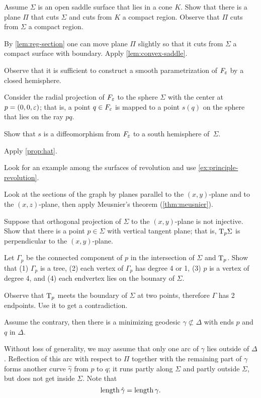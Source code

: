 Assume $\Sigma$ is an open saddle surface that lies in a cone $K$.
Show that there is a plane $\Pi$ that cuts $\Sigma$ and cuts from $K$ a compact region.
Observe that $\Pi$ cuts from $\Sigma$ a compact region.

By \ref{lem:reg-section} one can move plane $\Pi$ slightly so that it cuts from $\Sigma$ a compact surface with boundary.
Apply \ref{lem:convex-saddle}.


 Observe that it is sufficient to construct a smooth parametrization of $F_\varepsilon$ by a closed hemisphere.

Consider the radial projection of $F_\varepsilon$ to the sphere $\Sigma$ with the center at $p=(0,0,\varepsilon)$;
that is, a point $q\in F_\varepsilon$ is mapped to a point $s(q)$ on the sphere that lies on the ray $pq$.

Show that $s$ is a diffeomorphism from $F_\varepsilon$ to a south hemisphere of~$\Sigma$.

 Apply \ref{prop:hat}.

 Look for an example among the surfaces of revolution and use \ref{ex:principle-revolution}.

 Look at the sections of the graph by planes parallel to the $(x,y)$-plane and to the $(x,z)$-plane, then apply Meusnier’s theorem (\ref{thm:meusnier}).

Suppose that orthogonal projection of $\Sigma$ to the $(x,y)$-plane is not injective.
Show that there is a point $p\in\Sigma$ with vertical tangent plane;
that is, $\mathrm{T}_p\Sigma$ is perpendicular to the $(x,y)$-plane.

Let $\Gamma_p$ be the connected component of $p$ in the intersection of $\Sigma$ and $\mathrm{T}_p$.
Show that (1) $\Gamma_p$ is a tree, (2) each vertex of $\Gamma_p$ has degree 4 or 1, (3) $p$ is a vertex of degree 4, and (4) each endvertex lies on the bounary of $\Sigma$.

Observe that $\mathrm{T}_p$ meets the boundary of $\Sigma$ at two points,
therefore $\Gamma$ has 2 endpoints.
Use it to get a contradiction.

 Assume the contrary,
then there is a minimizing geodesic $\gamma\not\subset\Delta$ with ends $p$ and $q$ in $\Delta$.

Without loss of generality, we may assume that only one arc of $\gamma$ lies outside of $\Delta$.
Reflection of this arc  with respect to $\Pi$ together with the remaining part of $\gamma$ forms another curve $\hat\gamma$ from $p$ to $q$;
it runs partly along $\Sigma$ 
and partly outside $\Sigma$,
but does not get inside $\Sigma$.
Note that
\[\mathop{\rm length}\nolimits\hat\gamma=\mathop{\rm length}\nolimits\gamma.\]


